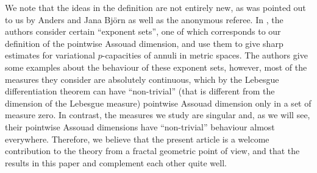 \documentclass{PRM}
\theoremstyle{plain}
\theoremstyle{definition}
\theoremstyle{remark}
\begin{document}
We note that the ideas in the definition are not entirely new, as was pointed out to us by Anders and Jana Björn as well as the anonymous referee. In \cite{BBL}, the authors consider certain ``exponent sets'', one of which corresponds to our definition of the pointwise Assouad dimension, and use them to give sharp estimates for variational $p$-capacities of annuli in metric spaces. The authors give some examples about the behaviour of these exponent sets, however, most of the measures they consider are absolutely continuous, which by the Lebesgue differentiation theorem can have ``non-trivial'' (that is different from the dimension of the Lebesgue measure) pointwise Assouad dimension only in a set of measure zero. In contrast, the measures we study are singular and, as we will see, their pointwise Assouad dimensions have ``non-trivial'' behaviour almost everywhere. Therefore, we believe that the present article is a welcome contribution to the theory from a fractal geometric point of view, and that the results in this paper and \cite{BBL} complement each other quite well.
\end{document}
